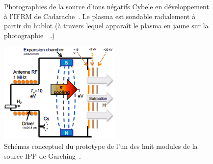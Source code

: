 \begin{refsection}
\begin{figure}[!htbp]
  \centering
    \caption{Photographies de la source d'ions négatifs Cybele en développement
    à l'IFRM de Cadarache~\parencite{SimoninHDR}. Le plasma est
    sondable radialement à partir du hublot (à travers lequel apparaît le
    plasma en jaune sur la photographie~~.)
    \label{4-cybelePhoto}} 
\end{figure}	

\begin{figure}[!htbp]
  \centering
    \includegraphics[height=5cm]{figures/sourceIPP.png}
    \caption{Schémas conceptuel du prototype de l'un des huit modules de la
    source IPP de Garching~\parencite{SimoninHDR}.
\label{4-GarchingSchema}}
\end{figure}


\end{refsection}
